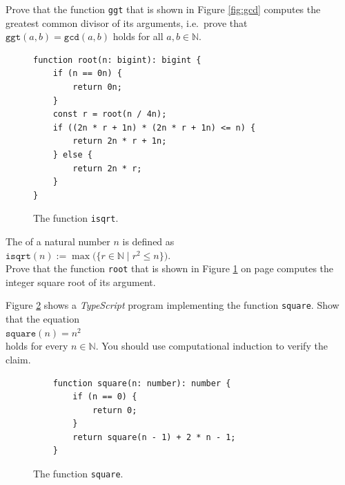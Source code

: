 \exerciseEng
Prove that the function \texttt{ggt} that is shown in Figure \ref{fig:gcd} computes the greatest common divisor
of its arguments, i.e.~prove that $\mathtt{ggt}(a, b) = \mathtt{gcd}(a, b)$ holds for all $a,b \in\mathbb{N}$.
\eox

\begin{figure}[!h]
  \centering
\begin{verbatim}
function root(n: bigint): bigint {
    if (n == 0n) {
        return 0n;
    }
    const r = root(n / 4n);
    if ((2n * r + 1n) * (2n * r + 1n) <= n) {
        return 2n * r + 1n;
    } else {
        return 2n * r;
    }
}
\end{verbatim}
\vspace*{-0.3cm}
  \caption{The function \texttt{isqrt}.}
  \label{fig:isqrt}
\end{figure} 

\exerciseEng
The  of a natural number $n$ is defined as 
\\[0.2cm]
\hspace*{1.3cm}
$\texttt{isqrt}(n) := \max\bigl(\{ r \in \mathbb{N} \mid r^2 \leq n \}\bigr)$.
\\[0.2cm]
Prove that the function \texttt{root} that is shown in Figure \ref{fig:isqrt} on page \pageref{fig:isqrt}
computes the integer square root of its argument. \eox


\exerciseEng
Figure \ref{fig:square} shows a \textsl{TypeScript} program implementing the function \texttt{square}.  Show that the equation
\\[0.2cm]
\hspace*{1.3cm}
$\mathtt{square}(n) = n^2$
\\[0.2cm]
holds for every $n \in \mathbb{N}$.  You should use computational induction to verify the claim. \eox

\begin{figure}[!ht]
\centering
\begin{verbatim}
    function square(n: number): number {
        if (n == 0) {
            return 0;
        }
        return square(n - 1) + 2 * n - 1;
    }                
\end{verbatim}
\vspace*{-0.3cm}
\caption{The function \texttt{square}.}
\label{fig:square}
\end{figure}

